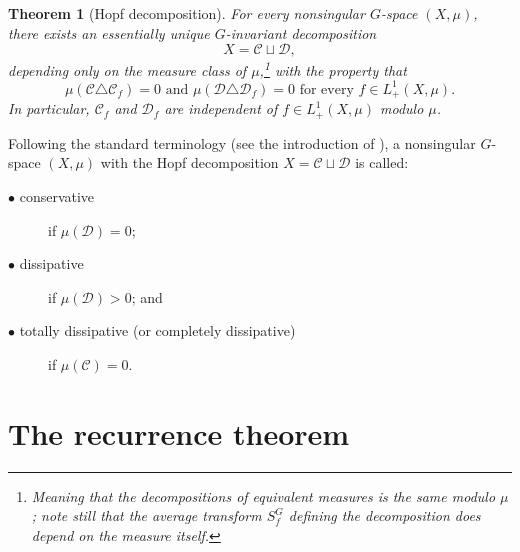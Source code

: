 \documentclass{amsart}
\numberwithin{equation}{subsection}
\newtheorem{mainthm}{Theorem}
\begin{document}
\begin{mainthm}[Hopf decomposition]
\label{mthm:hopfdeco}
For every nonsingular \(G\)-space \(\left(X,\mu\right)\), there exists an essentially unique \(G\)-invariant decomposition
\[X=\mathcal{C}\sqcup\mathcal{D},\]
depending only on the measure class of \(\mu\),\footnote{Meaning that the decompositions of equivalent measures is the same modulo \(\mu\); note still that the average transform \(S_{f}^{G}\) defining the decomposition does depend on the measure itself.} with the property that
\[\mu\left(\mathcal{C}\triangle\mathcal{C}_{f}\right)=0\text{ and }\mu\left(\mathcal{D}\triangle\mathcal{D}_{f}\right)=0\text{ for every }f\in L_{+}^{1}\left(X,\mu\right).\]
In particular, \(\mathcal{C}_{f}\) and \(\mathcal{D}_{f}\) are independent of \(f\in L_{+}^{1}\left(X,\mu\right)\) modulo \(\mu\).
\end{mainthm}

Following the standard terminology (see the introduction of \cite{danilenko2023ergodic}), a nonsingular \(G\)-space \(\left(X,\mu\right)\) with the Hopf decomposition \(X=\mathcal{C}\sqcup\mathcal{D}\) is called:
\begin{description}
    \item[\(\bullet\) conservative] if \(\mu\left(\mathcal{D}\right)=0\);
    \item[\(\bullet\) dissipative] if \(\mu\left(\mathcal{D}\right)>0\); and
    \item[\(\bullet\) totally dissipative \textnormal{(or} completely dissipative\textnormal{)}] if \(\mu\left(\mathcal{C}\right)=0\).
\end{description}

\section{The recurrence theorem}
\end{document}
